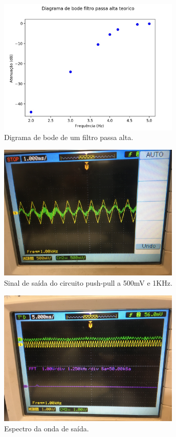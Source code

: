     \begin{figure}[h!]
        \centering
        \includegraphics[height=6.5cm]{imgSource/charts/passaalta.jpg}
        \caption{Digrama de bode de um filtro passa alta.}
        \label{fig:passaAlta}
    \end{figure}

   \begin{figure}[h!]
        \centering
        \includegraphics[height=6.5cm]{imgSource/oscilloscope/foto0.jpg}
        \caption{Sinal de saída do circuito push-pull a 500mV e 1KHz.}
        \label{fig:foto1}
    \end{figure}
    
    \begin{figure}[h!]
        \centering
        \includegraphics[height=6.5cm]{imgSource/oscilloscope/foto1.jpg}
        \caption{Espectro da onda de saída.}
        \label{fig:foto2}
    \end{figure}
   
